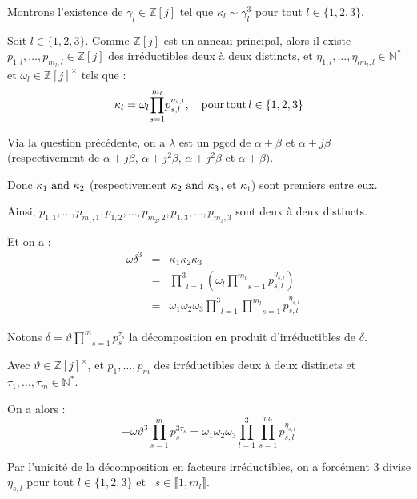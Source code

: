 Montrons l'existence de $\gamma_l \in \mathbb{Z} [j]$ tel que $\kappa_l \sim
\gamma_l^3$ pour tout $l \in \{ 1, 2, 3 \}$.

Soit $l \in \{ 1, 2, 3 \}$. Comme $\mathbb{Z} [j]$ est un anneau principal,
alors il existe $p_{1, l}, \ldots, p_{m_l, l} \in \mathbb{Z} [j]$ des
irr{\'e}ductibles deux {\`a} deux distincts, et $\eta_{1, l}, \ldots, \eta_{l 
m_l, l} \in \mathbb{N}^{\ast}$ et $\omega_l \in \mathbb{Z} [j]^{\times}$ tels
que :
\[ \kappa_l = \omega_l \underset{s = 1}{\overset{m_l}{\prod}} p^{\eta_{s,
   l}}_{s, l}, \quad \operatorname{pour} \operatorname{tout} l \in \{ 1, 2, 3 \} \]


Via la question pr{\'e}c{\'e}dente, on a $\lambda$ est un pgcd de $\alpha +
\beta$ et $\alpha + j \beta$ (respectivement de $\alpha + j \beta$, $\alpha +
j^2 \beta$, $\alpha + j^2 \beta$ et $\alpha + \beta$).

Donc $\kappa_1 \text{ and } \kappa_2$ (respectivement $\kappa_2 \text{ and }
\kappa_3$, et $\kappa_1$) sont premiers entre eux.

Ainsi, $p_{1, 1}, \ldots, p_{m_1, 1}, p_{1, 2}, \ldots, p_{m_2, 2}, p_{1, 3},
\ldots, p_{m_3, 3}$ sont deux {\`a} deux distincts.

Et on a :
\begin{eqnarray*}
  - \omega \delta^3 & = & \kappa_1 \kappa_2 \kappa_3\\
  & = & \underset{l = 1}{\overset{3}{\prod}} \left( \omega_l \underset{s =
  1}{\overset{m_l}{\prod}} p^{\eta_{s, l}}_{s, l} \right)\\
  & = & \omega_1 \omega_2 \omega_3 \underset{l = 1}{\overset{3}{\prod}}
  \underset{s = 1}{\overset{m_l}{\prod}} p^{\eta_{s, l}}_{s, l}
\end{eqnarray*}


Notons $\delta = \vartheta \underset{s = 1}{\overset{m}{\prod}} p^{\tau_s}_s$
la d{\'e}composition en produit d'irr{\'e}ductibles de $\delta$.

Avec $\vartheta \in \mathbb{Z} [j]^{\times}$, et $p_1, \ldots, p_m$ des
irr{\'e}ductibles deux {\`a} deux distincts et $\tau_1, \ldots, \tau_m \in
\mathbb{N}^{\ast}$.

On a alors :
\[ - \omega \vartheta^3 \underset{s = 1}{\overset{m}{\prod}} p^{3 \tau_s}_s =
   \omega_1 \omega_2 \omega_3 \underset{l = 1}{\overset{3}{\prod}} \underset{s
   = 1}{\overset{m_l}{\prod}} p^{\eta_{s, l}}_{s, l} \]


Par l'unicit{\'e} de la d{\'e}composition en facteurs irr{\'e}ductibles, on a
forc{\'e}ment $3$ divise $\eta_{s, l}$ pour tout $l \in \{ 1, 2, 3 \}$ et \ $s
\in \llbracket 1, m_l \rrbracket$.

